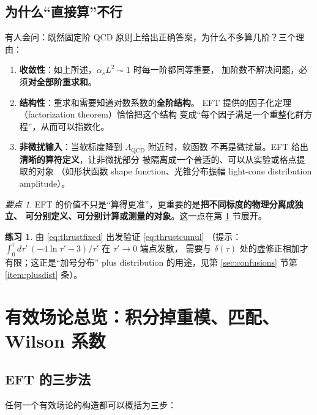 \documentclass[UTF8,a4paper,11pt]{ctexart}
\theoremstyle{definition}
\newtheorem{exercise}{练习}[section]
\theoremstyle{remark}
\newtheorem{keypoint}{要点}[section]
\theoremstyle{plain}
\newcommand{\as}{\alpha_s}
\newcommand{\LQCD}{\Lambda_{\mathrm{QCD}}}
\newcommand{\en}[1]{\textsf{#1}}   %
\begin{document}
\subsection{为什么“直接算”不行}

有人会问：既然固定阶 QCD 原则上给出正确答案，为什么不多算几阶？三个理由：

\begin{enumerate}[label=(\roman*)]
  \item \textbf{收敛性}：如上所述，$\as L^2\sim1$ 时每一阶都同等重要，
        加阶数不解决问题，必须\textbf{对全部阶重求和}。
  \item \textbf{结构性}：重求和需要知道对数系数的\textbf{全阶结构}。
        EFT 提供的因子化定理（\en{factorization theorem}）恰恰把这个结构
        变成“每个因子满足一个重整化群方程”，从而可以指数化。
  \item \textbf{非微扰输入}：当软标度降到 $\LQCD$ 附近时，软函数
        不再是微扰量。EFT 给出\textbf{清晰的算符定义}，让非微扰部分
        被隔离成一个普适的、可以从实验或格点提取的对象
        （如形状函数 \en{shape function}、光锥分布振幅 \en{light-cone distribution amplitude}）。
\end{enumerate}

\begin{keypoint}
EFT 的价值不只是“算得更准”，更重要的是\textbf{把不同标度的物理分离成独立、
可分别定义、可分别计算或测量的对象}。这一点在第 \ref{sec:eft} 节展开。
\end{keypoint}

\begin{exercise}
由 \eqref{eq:thrustfixed} 出发验证 \eqref{eq:thrustcumul}
（提示：$\int_0^\tau d\tau'\,(-4\ln\tau'-3)/\tau'$ 在 $\tau'\to0$ 端点发散，
需要与 $\delta(\tau)$ 处的虚修正相加才有限；这正是“加号分布”
\en{plus distribution} 的用途，见第 \ref{sec:confusions} 节第 \ref{item:plusdist} 条）。
\end{exercise}

\section{有效场论总览：积分掉重模、匹配、Wilson 系数}
\label{sec:eft}

\subsection{EFT 的三步法}

任何一个有效场论的构造都可以概括为三步：
\end{document}
